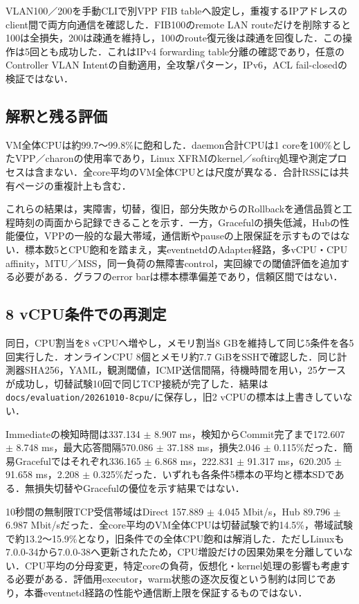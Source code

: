 \documentclass[11pt,a4paper,twoside]{ltjsarticle}
\begin{document}
VLAN100／200を手動CLIで別VPP FIB tableへ設定し，重複するIPアドレスのclient間で両方向通信を確認した．FIB100のremote LAN routeだけを削除すると100は全損失，200は疎通を維持し，100のroute復元後は疎通を回復した．この操作は5回とも成功した．これはIPv4 forwarding table分離の確認であり，任意のController VLAN Intentの自動適用，全攻撃パターン，IPv6，ACL fail-closedの検証ではない．

\subsection{解釈と残る評価}

VM全体CPUは約99.7〜99.8\%に飽和した．daemon合計CPUは1 coreを100\%としたVPP／charonの使用率であり，Linux XFRMのkernel／softirq処理や測定プロセスは含まない．全core平均のVM全体CPUとは尺度が異なる．合計RSSには共有ページの重複計上も含む．

これらの結果は，実障害，切替，復旧，部分失敗からのRollbackを通信品質と工程時刻の両面から記録できることを示す．一方，Gracefulの損失低減，Hubの性能優位，VPPの一般的な最大帯域，通信断やpauseの上限保証を示すものではない．標本数5とCPU飽和を踏まえ，実eventnetdのAdapter経路，多vCPU・CPU affinity，MTU／MSS，同一負荷の無障害control，実回線での閾値評価を追加する必要がある．グラフのerror barは標本標準偏差であり，信頼区間ではない．

\subsection{8 vCPU条件での再測定}
同日，CPU割当を8 vCPUへ増やし，メモリ割当8 GBを維持して同じ5条件を各5回実行した．オンラインCPU 8個とメモリ約7.7 GiBをSSHで確認した．同じ計測器SHA256，YAML，観測閾値，ICMP送信間隔，待機時間を用い，25ケースが成功し，切替試験10回で同じTCP接続が完了した．結果は\texttt{docs/evaluation/20261010-8cpu/}に保存し，旧2 vCPUの標本は上書きしていない．

Immediateの検知時間は337.134 $\pm$ 8.907 ms，検知からCommit完了まで172.607 $\pm$ 8.748 ms，最大応答間隔570.086 $\pm$ 37.188 ms，損失2.046 $\pm$ 0.115\%だった．簡易Gracefulではそれぞれ336.165 $\pm$ 6.868 ms，222.831 $\pm$ 91.317 ms，620.205 $\pm$ 91.658 ms，2.208 $\pm$ 0.325\%だった．いずれも各条件5標本の平均と標本SDである．無損失切替やGracefulの優位を示す結果ではない．

10秒間の無制限TCP受信帯域はDirect 157.889 $\pm$ 4.045 Mbit/s，Hub 89.796 $\pm$ 6.987 Mbit/sだった．全core平均のVM全体CPUは切替試験で約14.5\%，帯域試験で約13.2〜15.9\%となり，旧条件での全体CPU飽和は解消した．ただしLinuxも7.0.0-34から7.0.0-38へ更新されたため，CPU増設だけの因果効果を分離していない．CPU平均の分母変更，特定coreの負荷，仮想化・kernel処理の影響も考慮する必要がある．評価用executor，warm状態の逐次反復という制約は同じであり，本番eventnetd経路の性能や通信断上限を保証するものではない．
\end{document}
